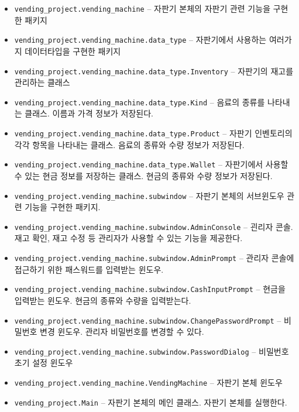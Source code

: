\documentclass{oblivoir}
\begin{document}
\begin{itemize}
        \item \texttt{vending\_project.vending\_machine} --
        자판기 본체의 자판기 관련 기능을 구현한 패키지
        \item \texttt{vending\_project.vending\_machine.data\_type} --
        자판기에서 사용하는 여러가지 데이터타입을 구현한 패키지
        \item \texttt{vending\_project.vending\_machine.data\_type.Inventory} --
        자판기의 재고를 관리하는 클래스
        \item \texttt{vending\_project.vending\_machine.data\_type.Kind} --
        음료의 종류를 나타내는 클래스.
        이름과 가격 정보가 저장된다.
        \item \texttt{vending\_project.vending\_machine.data\_type.Product} --
        자판기 인벤토리의 각각 항목을 나타내는 클래스.
        음료의 종류와 수량 정보가 저장된다.
        \item \texttt{vending\_project.vending\_machine.data\_type.Wallet} --
        자판기에서 사용할 수 있는 현금 정보를 저장하는 클래스.
        현금의 종류와 수량 정보가 저장된다.
        \item \texttt{vending\_project.vending\_machine.subwindow} --
        자판기 본체의 서브윈도우 관련 기능을 구현한 패키지.
        \item \texttt{vending\_project.vending\_machine.subwindow.AdminConsole} --
        괸리자 콘솔.
        재고 확인, 재고 수정 등 관리자가 사용할 수 있는 기능을 제공한다.
        \item \texttt{vending\_project.vending\_machine.subwindow.AdminPrompt} --
        관리자 콘솔에 접근하기 위한 패스워드를 입력받는 윈도우.
        \item \texttt{vending\_project.vending\_machine.subwindow.CashInputPrompt} --
        현금을 입력받는 윈도우.
        현금의 종류와 수량을 입력받는다.
        \item \texttt{vending\_project.vending\_machine.subwindow.ChangePasswordPrompt} --
        비밀번호 변경 윈도우.
        관리자 비밀번호를 변경할 수 있다.
        \item \texttt{vending\_project.vending\_machine.subwindow.PasswordDialog} --
        비밀번호 초기 설정 윈도우
        \item \texttt{vending\_project.vending\_machine.VendingMachine} --
        자판기 본체 윈도우
        \item \texttt{vending\_project.Main} --
        자판기 본체의 메인 클래스.
        자판기 본체를 실행한다.
    \end{itemize}
\end{document}
